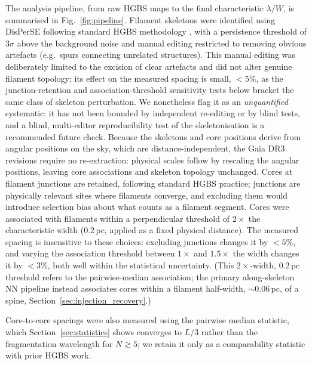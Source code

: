 \documentclass[usenatbib,twoside,twocolumn]{mnras}
\begin{document}
The analysis pipeline, from raw HGBS maps to the final characteristic $\lambda/W$, is summarised in Fig.~\ref{fig:pipeline}. Filament skeletons were identified using DisPerSE \citep{Sousbie2011} following standard HGBS methodology \citep{Arzoumanian2011}, with a persistence threshold of $3\sigma$ above the background noise and manual editing restricted to removing obvious artefacts (e.g.\ spurs connecting unrelated structures). This manual editing was deliberately limited to the excision of clear artefacts and did not alter genuine filament topology; its effect on the measured spacing is small, $<5\%$, as the junction-retention and association-threshold sensitivity tests below bracket the same class of skeleton perturbation. We nonetheless flag it as an \emph{unquantified} systematic: it has not been bounded by independent re-editing or by blind tests, and a blind, multi-editor reproducibility test of the skeletonisation is a recommended future check. Because the skeletons and core positions derive from angular positions on the sky, which are distance-independent, the Gaia DR3 revisions require no re-extraction: physical scales follow by rescaling the angular positions, leaving core associations and skeleton topology unchanged. Cores at filament junctions are retained, following standard HGBS practice; junctions are physically relevant sites where filaments converge, and excluding them would introduce selection bias about what counts as a filament segment. Cores were associated with filaments within a perpendicular threshold of $2\times$ the characteristic width ($0.2$\,pc, applied as a fixed physical distance). The measured spacing is insensitive to these choices: excluding junctions changes it by $<5\%$, and varying the association threshold between $1\times$ and $1.5\times$ the width changes it by $<3\%$, both well within the statistical uncertainty. (This $2\times$-width, $0.2$\,pc threshold refers to the pairwise-median association; the primary along-skeleton NN pipeline instead associates cores within a filament half-width, $\sim0.06$\,pc, of a spine, Section~\ref{sec:injection_recovery}.)

Core-to-core spacings were also measured using the pairwise median statistic, which Section~\ref{sec:statistics} shows converges to $L/3$ rather than the fragmentation wavelength for $N\gtrsim5$; we retain it only as a comparability statistic with prior HGBS work.
\end{document}
